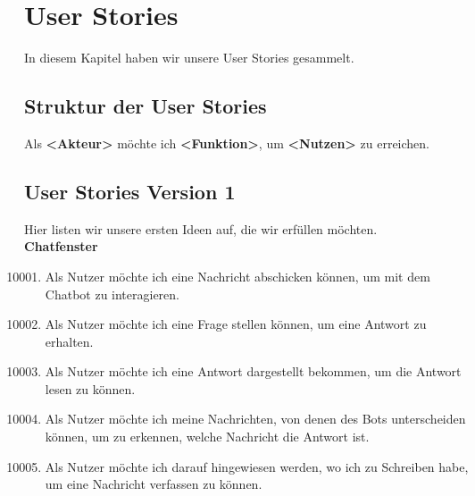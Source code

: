 \section{User Stories}
In diesem Kapitel haben wir unsere User Stories gesammelt.

\subsection{Struktur der User Stories}
Als \textbf{<Akteur>} möchte ich \textbf{<Funktion>}, um \textbf{<Nutzen>} zu erreichen.
\subsection{User Stories Version 1}
Hier listen wir unsere ersten Ideen auf, die wir erfüllen möchten.
\\

\textbf{Chatfenster}
\begin{enumerate}[leftmargin=*,labelindent=40pt,label=u\arabic*.]
    \setcounter{enumi}{10000}
    \item Als Nutzer möchte ich eine Nachricht abschicken können, um mit dem Chatbot zu interagieren.
    \item Als Nutzer möchte ich eine Frage stellen können, um eine Antwort zu erhalten.
    \item Als Nutzer möchte ich eine Antwort dargestellt bekommen, um die Antwort lesen zu können.
    \item Als Nutzer möchte ich meine Nachrichten, von denen des Bots unterscheiden können, um zu erkennen, welche Nachricht die Antwort ist.
    \item Als Nutzer möchte ich darauf hingewiesen werden, wo ich zu Schreiben habe, um eine Nachricht verfassen zu können.
\end{enumerate}


